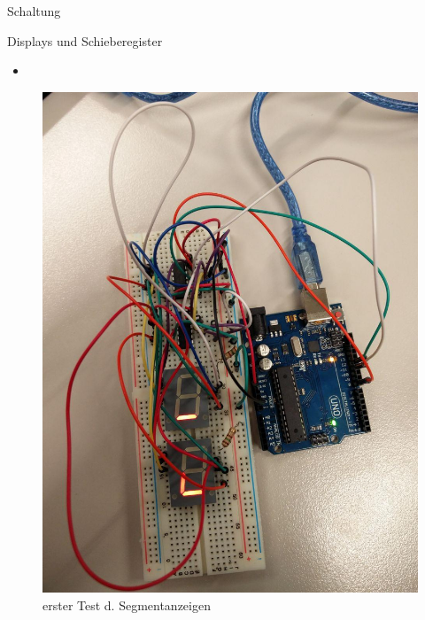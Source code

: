 \documentclass[mathserif,9pt]{beamer}
\begin{document}
    \begin{frame}{Schaltung}
        \begin{block}{Displays und Schieberegister}
            \begin{minipage}[c]{0.6\textwidth}
                \begin{itemize}
                    \item 
                \end{itemize}
            \end{minipage}
            \hfill
            \begin{minipage}[c]{0.3\textwidth}
               \begin{figure} 
                    \includegraphics[width=\textwidth]{img/breadboard.jpg}
                    \caption{erster Test d. Segmentanzeigen}
                    \label{fig:breadboard}
               \end{figure}
            \end{minipage}
        \end{block}
    \end{frame}
\end{document}
